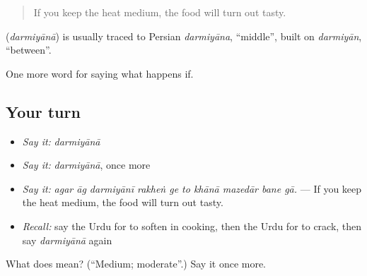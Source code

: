 \begin{quote}
If you keep the heat medium, the food will turn out tasty.
\end{quote}

\begin{cousinweb}
\textbf{} (\emph{darmiyānā}) is usually traced to Persian \emph{darmiyāna}, \textquotedblleft{}middle\textquotedblright{}, built on \emph{darmiyān}, \textquotedblleft{}between\textquotedblright{}.
\end{cousinweb}

\begin{grammarlens}[title={What you've built}]
One more word for saying what happens if.
\end{grammarlens}

\subsection*{Your turn}
\begin{itemize}
\raggedright
  \item \emph{Say it:} \emph{darmiyānā}
  \item \emph{Say it:} \emph{darmiyānā}, once more
  \item \emph{Say it:} \emph{agar āg darmiyānī rakheṅ ge to khānā mazedār bane gā.} — If you keep the heat medium, the food will turn out tasty.
  \item \emph{Recall:} say the Urdu for to soften in cooking, then the Urdu for to crack, then say \emph{darmiyānā} again
\end{itemize}

\begin{tcolorbox}[breakable,colback=teal!4,colframe=teal!35!black,title={Before you move on}]
What does  mean? (\textquotedblleft{}Medium; moderate\textquotedblright{}.) Say it once more.
\end{tcolorbox}
